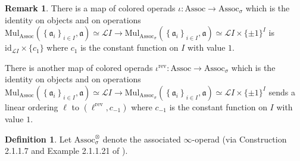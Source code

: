 \documentclass{article}
\newcommand{\Associnv}{\mathrm{Assoc}_\sigma}
\theoremstyle{definition}
\newtheorem{definition}[equation]{Definition}
\newtheorem{remark}[equation]{Remark}
\begin{document}
\begin{remark}\label{rmk:assoc_opd_to_assoc_inv_opd}
    There is a map of colored operads $ \iota \colon \mathrm{Assoc} \to \Associnv $ which is the identity on objects and on operations $ \mathrm{Mul}_{\mathrm{Assoc}}\left(\left\{\mathfrak{a}_i\right\}_{i \in I}, \mathfrak{a}\right) \simeq  \mathcal{L}I \to \mathrm{Mul}_{\Associnv}\left(\left\{\mathfrak{a}_i\right\}_{i \in I}, \mathfrak{a}\right) \simeq  \mathcal{L}I \times \{\pm 1\}^I $ is $ \mathrm{id}_{\mathcal{L}I} \times \{ c_1\} $ where $ c_1 $ is the constant function on $ I $ with value $ 1 $. 

    There is another map of colored operads $ \iota^{\mathrm{rev}} \colon \mathrm{Assoc} \to \Associnv $ which is the identity on objects and on operations $ \mathrm{Mul}_{\mathrm{Assoc}}\left(\left\{\mathfrak{a}_i\right\}_{i \in I}, \mathfrak{a}\right) \simeq  \mathcal{L}I \to \mathrm{Mul}_{\Associnv}\left(\left\{\mathfrak{a}_i\right\}_{i \in I}, \mathfrak{a}\right) \simeq  \mathcal{L}I \times \{\pm 1\}^I $ sends a linear ordering $ \ell $ to $ (\ell^{\mathrm{rev}}, c_{-1})$ where $ c_{-1} $ is the constant function on $ I $ with value $ 1 $. 
\end{remark}
\begin{definition}\label{defn:infty_operad_monoid_with_involution}
    Let $ \Associnv^\otimes $ denote the associated $ \infty $-operad (via Construction 2.1.1.7 and Example 2.1.1.21 of \cite{LurHA}). 
\end{definition} 
\end{document}
